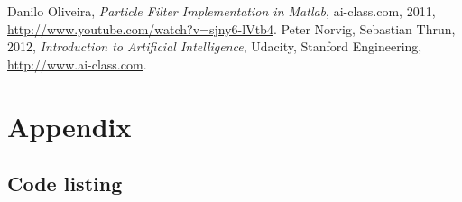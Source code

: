 \documentclass[paper=a4, fontsize=12pt]{scrartcl}	%
\numberwithin{equation}{section}		%
\numberwithin{figure}{section}			%
\numberwithin{table}{section}				%
\begin{document}
\begin{thebibliography}{9}
  Danilo Oliveira,
  \emph{Particle Filter Implementation in Matlab},
  ai-class.com,
  2011,
  \url{http://www.youtube.com/watch?v=sjny6-lVtb4}.
  Peter Norvig, Sebastian Thrun,
  2012,
  \emph{Introduction to Artificial Intelligence},
  Udacity, Stanford Engineering,
  \url{http://www.ai-class.com}.
\end{thebibliography}
\section{Appendix}
\subsection{Code listing}

\end{document}
